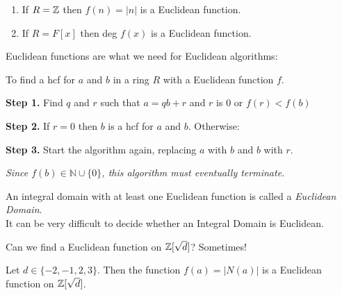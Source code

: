 \documentclass[10pt]{scrartcl}
\begin{document}
\begin{examples} \begin{enumerate}
 \item If $R = \mathbb{Z}$ then $f(n) = |n|$ is a Euclidean function. 
 \item If $R = F[x]$ then deg $f(x)$ is a Euclidean function.	
 \end{enumerate}\end{examples}
 \vspace*{5pt}

Euclidean functions are what we need for Euclidean algorithms: \vspace*{5pt}\\
\begin{algorithm}To find a hcf for $a$ and $b$ in a ring $R$ with a Euclidean function $f$.

\textbf{Step 1.} Find $q$ and $r$ such that $a = qb + r$ and $r$ is $0$ or $f(r) < f(b)$

\textbf{Step 2.}	If $r = 0$ then $b$ is a hcf for $a$ and $b$. Otherwise:

\textbf{Step 3.} Start the algorithm again, replacing $a$ with $b$ and $b$ with $r$.

\textit{Since $f(b) \in \mathbb{N}\cup \{0\}$, this algorithm must eventually terminate.}
\end{algorithm}\vspace*{5pt}

\begin{definition} An integral domain with at least one Euclidean function is called a \emph{Euclidean Domain}.\vspace*{5pt}\\
It can be very difficult to decide whether an Integral Domain is Euclidean.
\end{definition}\vspace*{5pt}

Can we find a Euclidean function on $\mathbb{Z}[\sqrt{d}]$? Sometimes!\\

\begin{proposition} Let $d \in \{-2,-1,2,3\}.$ Then the function $f(a) = |N(a)|$ is a Euclidean function on $\mathbb{Z}[\sqrt{d}]$.	
\end{proposition}
\end{document}
